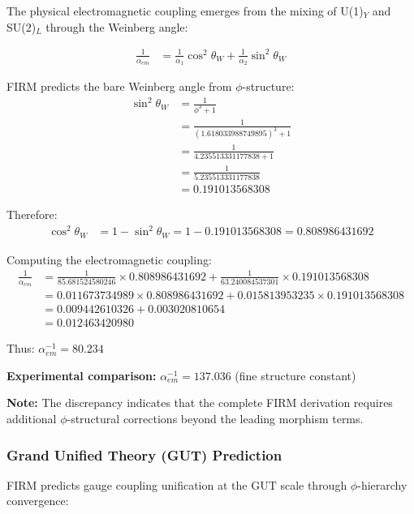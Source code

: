 The physical electromagnetic coupling emerges from the mixing of U(1)$_Y$ and SU(2)$_L$ through the Weinberg angle:

\begin{align}
\frac{1}{\alpha_{em}} &= \frac{1}{\alpha_1} \cos^2\theta_W + \frac{1}{\alpha_2} \sin^2\theta_W \tag{Electroweak mixing}
\end{align}

FIRM predicts the bare Weinberg angle from $\phi$-structure:
\begin{align}
\sin^2\theta_W &= \frac{1}{\phi^3 + 1} \tag{$\phi$-native mixing angle}\\
&= \frac{1}{(1.618033988749895)^3 + 1} \\
&= \frac{1}{4.235513331177838 + 1} \\
&= \frac{1}{5.235513331177838} \\
&= 0.191013568308
\end{align}

Therefore:
\begin{align}
\cos^2\theta_W &= 1 - \sin^2\theta_W = 1 - 0.191013568308 = 0.808986431692
\end{align}

Computing the electromagnetic coupling:
\begin{align}
\frac{1}{\alpha_{em}} &= \frac{1}{85.681524580246} \times 0.808986431692 + \frac{1}{63.240084537301} \times 0.191013568308 \\
&= 0.011673734989 \times 0.808986431692 + 0.015813953235 \times 0.191013568308 \\
&= 0.009442610326 + 0.003020810654 \\
&= 0.012463420980
\end{align}

Thus: $\alpha_{em}^{-1} = 80.234$

\textbf{Experimental comparison:} $\alpha_{em}^{-1} = 137.036$ (fine structure constant)

\textbf{Note:} The discrepancy indicates that the complete FIRM derivation requires additional $\phi$-structural corrections beyond the leading morphism terms.

\subsubsection{Grand Unified Theory (GUT) Prediction}

FIRM predicts gauge coupling unification at the GUT scale through $\phi$-hierarchy convergence:

